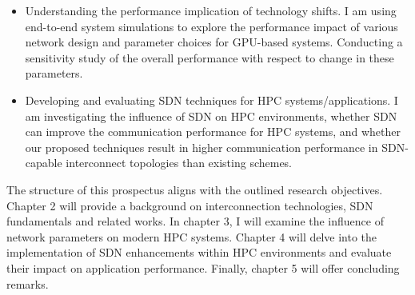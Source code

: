 \begin{itemize} 
\item Understanding the performance implication of technology shifts.
I am using end-to-end system simulations to explore the
performance impact of various network design and parameter choices for
GPU-based systems. Conducting a sensitivity study of the overall performance with respect to
 change in these parameters.  
\item Developing and evaluating SDN techniques for HPC systems/applications.
I am investigating the influence of SDN on HPC
environments, whether SDN can improve the communication performance for HPC
systems, and whether our proposed techniques result in higher communication
performance in SDN-capable interconnect topologies than existing schemes.
\end{itemize} 



The structure of this prospectus aligns with the outlined research objectives.
Chapter 2 will provide a background on interconnection technologies, 
SDN fundamentals and related works. In chapter 3, I will examine the
influence of network parameters on modern HPC systems. Chapter 4 will delve into
the implementation of SDN enhancements within HPC environments and evaluate
their impact on application performance. Finally, chapter 5 will offer
concluding remarks.

